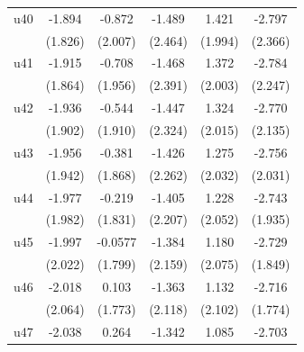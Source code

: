 \begin{table}[htbp]
\begin{tabular}{l*{5}{c}}
\addlinespace
u40                 &      -1.894         &      -0.872         &      -1.489         &       1.421         &      -2.797         \\
                    &     (1.826)         &     (2.007)         &     (2.464)         &     (1.994)         &     (2.366)         \\
\addlinespace
u41                 &      -1.915         &      -0.708         &      -1.468         &       1.372         &      -2.784         \\
                    &     (1.864)         &     (1.956)         &     (2.391)         &     (2.003)         &     (2.247)         \\
\addlinespace
u42                 &      -1.936         &      -0.544         &      -1.447         &       1.324         &      -2.770         \\
                    &     (1.902)         &     (1.910)         &     (2.324)         &     (2.015)         &     (2.135)         \\
\addlinespace
u43                 &      -1.956         &      -0.381         &      -1.426         &       1.275         &      -2.756         \\
                    &     (1.942)         &     (1.868)         &     (2.262)         &     (2.032)         &     (2.031)         \\
\addlinespace
u44                 &      -1.977         &      -0.219         &      -1.405         &       1.228         &      -2.743         \\
                    &     (1.982)         &     (1.831)         &     (2.207)         &     (2.052)         &     (1.935)         \\
\addlinespace
u45                 &      -1.997         &     -0.0577         &      -1.384         &       1.180         &      -2.729         \\
                    &     (2.022)         &     (1.799)         &     (2.159)         &     (2.075)         &     (1.849)         \\
\addlinespace
u46                 &      -2.018         &       0.103         &      -1.363         &       1.132         &      -2.716         \\
                    &     (2.064)         &     (1.773)         &     (2.118)         &     (2.102)         &     (1.774)         \\
\addlinespace
u47                 &      -2.038         &       0.264         &      -1.342         &       1.085         &      -2.703         \\

\end{tabular}
\end{table}
